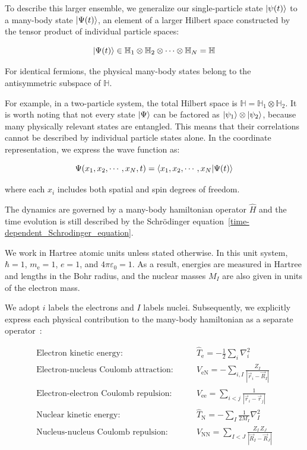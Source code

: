 To describe this larger ensemble, we generalize our single-particle state $\ket{\psi(t)}$ to a many-body state $\ket{\Psi(t)}$, an element of a larger Hilbert space constructed by the tensor product of individual particle spaces:

\begin{equation}
    \ket{\Psi(t)}\in \mathbb{H}_1\otimes\mathbb{H}_2\otimes \cdots\otimes\mathbb{H}_N=\mathbb{H}
\label{many-body_state_vector}
\end{equation}

For identical fermions, the physical many-body states belong to the antisymmetric subspace of $\mathbb{H}$.

For example, in a two-particle system, the total Hilbert space is $\mathbb{H}=\mathbb{H}_1\otimes\mathbb{H}_2$.
It is worth noting that not every state $\ket{\Psi}$ can be factored as  $\ket{\psi_1} \otimes \ket{\psi_2}$, because many physically relevant states are entangled.
This means that their correlations cannot be described by individual particle states alone. In the coordinate representation, we express the wave function as:

\begin{equation}
    \Psi(x_1,x_2,\cdots,x_N,t)=\braket{x_1,x_2,\cdots,x_N|\Psi(t)}
\label{many-body_wave_function}
\end{equation}

where each $x_i$ includes both spatial and spin degrees of freedom.

The dynamics are governed by a many-body hamiltonian operator $\hat{H}$ and the time evolution is still described by the Schrödinger equation~\eqref{time-dependent_Schrodinger_equation}.

We work in Hartree atomic units unless stated otherwise.
In this unit system, $\hbar=1$, $m_\mathrm{e}=1$, $e=1$, and $4\pi\varepsilon_0=1$.
As a result, energies are measured in Hartree and lengths in the Bohr radius, and the nuclear masses $M_I$ are also given in units of the electron mass.

We adopt $i$ labels the electrons and $I$ labels nuclei.
Subsequently, we explicitly express each physical contribution to the many-body hamiltonian as a separate operator~\cite{sholl2022density}:

\begin{align}
\text{Electron kinetic energy:}\qquad & \hat{T}_\mathrm{e} = -\frac{1}{2}\sum_i\nabla_i^2
\label{electrons_kinetic} \\
\text{Electron-nucleus Coulomb attraction:}\qquad & \hat{V}_\mathrm{eN}=-\sum_{i,I}\frac{Z_I}{|\vec{r}_i-\vec{R}_I|}
\label{electrons_nucleus_Coulomb} \\
\text{Electron-electron Coulomb repulsion:}\qquad & \hat{V}_\mathrm{ee}=\sum_{i<j}\frac{1}{|\vec{r}_i-\vec{r}_j|}
\label{electrons_Coulomb} \\
\text{Nuclear kinetic energy:}\qquad & \hat{T}_\mathrm{N} = -\sum_I\frac{1}{2M_I}\nabla_I^2
\label{nucleus_kinetic} \\
\text{Nucleus-nucleus Coulomb repulsion:}\qquad & \hat{V}_\mathrm{NN} = \sum_{I<J}\frac{Z_I\,Z_J}{|\vec{R}_I-\vec{R}_J|}
\label{nucleus_interaction}
\end{align}

